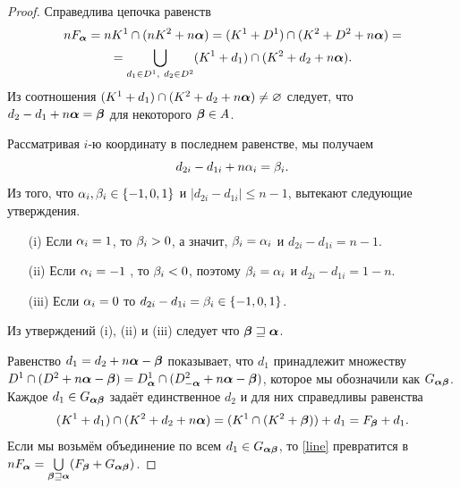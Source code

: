 \begin{proof}
Справедлива цепочка равенств
\begin{multline}\label{line}
nF_{\bm{\alpha}}=nK^1\cap(nK^2+n{\bm{\alpha}})=(K^1+D^1)\cap(K^2+D^2+n{\bm{\alpha}})=\\
=\bigcup\limits_{d_1\in D^1,\ d_2\in D^2}(K^1+d_1)\cap (K^2+d_2+n{\bm{\alpha}}).
\end{multline}
Из соотношения $(K^1+d_1)\cap (K^2+d_2+n{\bm{\alpha}})\neq\varnothing$ следует, что \\
$d_2-d_1+n{\bm{\alpha}}={\bm{\beta}}$ для некоторого ${\bm{\beta}}\in A$.

Рассматривая $i$-ю координату в последнем равенстве, мы получаем
$$d_{2i}-d_{1i}+n\alpha_i=\beta_i.$$ 
Из того, что $\alpha_i,\beta_i\in\{-1,0,1\}$ и $|d_{2i}-d_{1i}|\le n-1$, вытекают следующие утверждения.

\begin{itemize}[nolistsep]
 \item[(i)] Если $\alpha_i=1$, то $\beta_i>0$, а значит, $\beta_i=\alpha_i$ и $d_{2i}-d_{1i}=n-1$.
 \item[(ii)] Если $\alpha_i=-1$ , то $\beta_i<0$, поэтому $\beta_i=\alpha_i$ и $d_{2i}-d_{1i}=1-n$.
 \item[(iii)] Если $\alpha_i=0$ то $d_{2i}-d_{1i}=\beta_i\in\{-1,0,1\}$.
\end{itemize} 
\medskip

Из утверждений (i), (ii) и (iii) следует что ${\bm{\beta}}\sqsupseteq{\bm{\alpha}}$.

Равенство $d_1=d_2+n{\bm{\alpha}}-{\bm{\beta}}$ показывает, что $d_1$ принадлежит множеству $D^1\cap(D^2+n{\bm{\alpha}}-{\bm{\beta}})=D^1_{\bm{\alpha}}\cap(D^2_{-{\bm{\alpha}}}+n{\bm{\alpha}}-{\bm{\beta}})$, которое мы обозначили как $G_{{\bm{\alpha}}{\bm{\beta}}}$.
Каждое $d_1\in G_{{\bm{\alpha}}{\bm{\beta}}}$ задаёт единственное $d_2$ и для них справедливы равенства 
$$(K^1+d_1)\cap (K^2+d_2+n{\bm{\alpha}})= (K^1\cap(K^2+{\bm{\beta}}))+d_1= F_{\bm{\beta}}+d_1.$$ 
Если мы возьмём объединение по всем $d_1\in G_{{\bm{\alpha}}{\bm{\beta}}}$, то \eqref{line} превратится в $nF_{\bm{\alpha}}= \bigcup\limits_{{\bm{\beta}}\sqsupseteq{\bm{\alpha}}} (F_{\bm{\beta}}+G_{{\bm{\alpha}}{\bm{\beta}}})$.
\end{proof}

% 
% 

